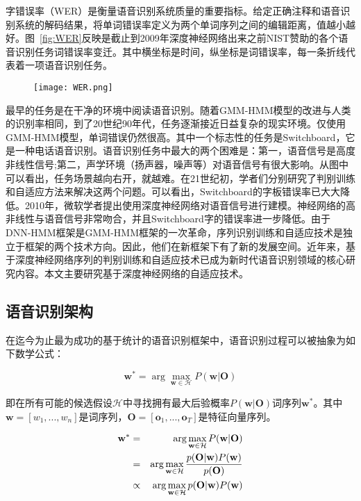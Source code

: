 字错误率（WER）是衡量语音识别系统质量的重要指标。给定正确注释和语音识别系统的解码结果，将单词错误率定义为两个单词序列之间的编辑距离，值越小越好。图~\ref{fig:WER}反映是截止到2009年深度神经网络出来之前NIST赞助的各个语音识别任务词错误率变迁。其中横坐标是时间，纵坐标是词错误率，每一条折线代表着一项语音识别任务。
\begin{figure}[!htp]
  \centering
    \captionstyle{\centering}
    \centering
    \texttt{[image: WER.png]}
\end{figure}

最早的任务是在干净的环境中阅读语音识别。随着GMM-HMM模型的改进与人类的识别率相同，到了20世纪90年代，任务逐渐接近日益复杂的现实环境。仅使用GMM-HMM模型，单词错误仍然很高。其中一个标志性的任务是Switchboard，它是一种电话语音识别。语音识别任务中最大的两个困难是：第一，语音信号是高度非线性信号;第二，声学环境（扬声器，噪声等）对语音信号有很大影响。从图中可以看出，任务场景越向右开，就越难。在21世纪初，学者们分别研究了判别训练和自适应方法来解决这两个问题。可以看出，Switchboard的字板错误率已大大降低。2010年，微软学者提出使用深度神经网络对语音信号进行建模。神经网络的高非线性与语音信号非常吻合，并且Switchboard字的错误率进一步降低。由于DNN-HMM框架是GMM-HMM框架的一次革命，序列识别训练和自适应技术是独立于框架的两个技术方向。因此，他们在新框架下有了新的发展空间。近年来，基于深度神经网络序列的判别训练和自适应技术已成为新时代语音识别领域的核心研究内容。本文主要研究基于深度神经网络的自适应技术。


\subsection{语音识别架构}
\label{chap:intro0-asr-framework}


在迄今为止最为成功的基于统计的语音识别框架中，语音识别过程可以被抽象为如下数学公式：

\begin{equation}
    \label{eq:asr}
    \mathbf{w}^* = \arg \max_{\mathbf{w} \in \mathcal{H}}P(\mathbf{w}|\mathbf{O})
\end{equation}

即在所有可能的候选假设$\mathcal{H}$中寻找拥有最大后验概率$P(\mathbf{w}|\mathbf{O})$词序列$\mathbf{w}^*$。其中$\mathbf{w}=\left[ w_1, ..., w_n \right]$是词序列，$\mathbf{O}=\left[ \mathbf{o}_1, ..., \mathbf{o}_T \right]$是特征向量序列。

\begin{eqnarray*}
    \centering
    \mathbf{w}^* &=& \arg \max_{\mathbf{w} \in \mathcal{H}}P(\mathbf{w}|\mathbf{O}) \\
    &=& \arg \max_{\mathbf{w} \in \mathcal{H}} \frac{p(\mathbf{O}|\mathbf{w})P(\mathbf{w})}{p(\mathbf{O})} \\
    &\propto& \arg \max_{\mathbf{w} \in \mathcal{H}} p(\mathbf{O}|\mathbf{w})P(\mathbf{w}) \\
\end{eqnarray*}

